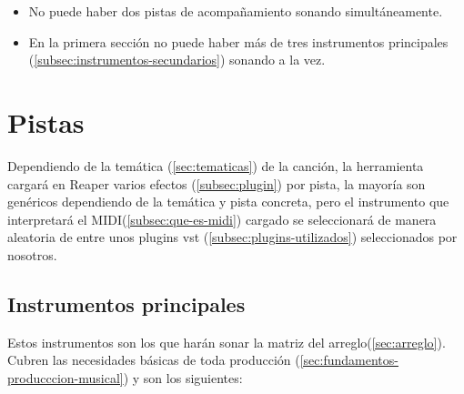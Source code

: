 \begin{itemize}

\item No puede haber dos pistas de acompañamiento sonando simultáneamente.
\item En la primera sección no puede haber más de tres instrumentos principales (\ref{subsec:instrumentos-secundarios}) sonando a la vez.
\end{itemize}

\section{Pistas}\label{sec:pistas}

Dependiendo de la temática (\ref{sec:tematicas}) de la canción, la herramienta cargará en Reaper varios efectos (\ref{subsec:plugin}) por pista, la mayoría son genéricos dependiendo de la temática y pista concreta, pero el instrumento que interpretará el MIDI(\ref{subsec:que-es-midi}) cargado se seleccionará de manera aleatoria de entre unos plugins vst (\ref{subsec:plugins-utilizados}) seleccionados por nosotros.

\subsection{Instrumentos principales}
\label{subsec:instrumentos-principales}
Estos instrumentos son los que harán sonar la matriz del arreglo(\ref{sec:arreglo}). Cubren las necesidades básicas de toda producción (\ref{sec:fundamentos-producccion-musical}) y son los siguientes:

